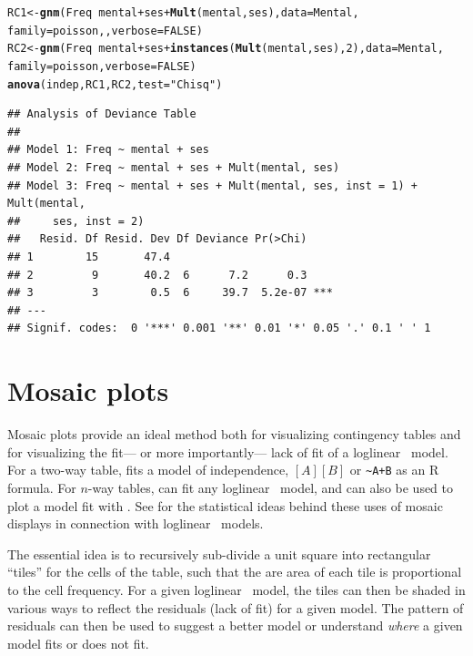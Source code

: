 \documentclass[10pt,twoside]{article}\usepackage[]{graphicx}\usepackage[]{color}
\makeatletter
\newcommand{\hlnum}[1]{\textcolor[rgb]{0.686,0.059,0.569}{#1}}%
\newcommand{\hlstr}[1]{\textcolor[rgb]{0.192,0.494,0.8}{#1}}%
\newcommand{\hlopt}[1]{\textcolor[rgb]{0,0,0}{#1}}%
\newcommand{\hlstd}[1]{\textcolor[rgb]{0.345,0.345,0.345}{#1}}%
\newcommand{\hlkwb}[1]{\textcolor[rgb]{0.69,0.353,0.396}{#1}}%
\newcommand{\hlkwc}[1]{\textcolor[rgb]{0.333,0.667,0.333}{#1}}%
\newcommand{\hlkwd}[1]{\textcolor[rgb]{0.737,0.353,0.396}{\textbf{#1}}}%
\newenvironment{kframe}{%
 \def\at@end@of@kframe{}%
 \ifinner\ifhmode%
  \def\at@end@of@kframe{\end{minipage}}%
  \begin{minipage}{\columnwidth}%
 \fi\fi%
 \def\FrameCommand##1{\hskip\@totalleftmargin \hskip-\fboxsep
 \colorbox{shadecolor}{##1}\hskip-\fboxsep
     \hskip-\linewidth \hskip-\@totalleftmargin \hskip\columnwidth}%
 \MakeFramed {\advance\hsize-\width
   \@totalleftmargin\z@ \linewidth\hsize
   \@setminipage}}%
 {\par\unskip\endMakeFramed%
 \at@end@of@kframe}
\newenvironment{knitrout}{}{} %
\newcommand{\loglin}{loglinear }
\newcommand{\codefun}[1]{\code{#1()}}
\let\proglang=\textsf
\makeatother
\begin{document}
\begin{knitrout}
\color{fgcolor}\begin{kframe}
\begin{alltt}
\hlstd{RC1} \hlkwb{<-} \hlkwd{gnm}\hlstd{(Freq} \hlopt{~} \hlstd{mental} \hlopt{+} \hlstd{ses} \hlopt{+} \hlkwd{Mult}\hlstd{(mental,ses),} \hlkwc{data}\hlstd{=Mental,}
             \hlkwc{family}\hlstd{=poisson, ,} \hlkwc{verbose}\hlstd{=}\hlnum{FALSE}\hlstd{)}
\hlstd{RC2} \hlkwb{<-} \hlkwd{gnm}\hlstd{(Freq} \hlopt{~} \hlstd{mental}\hlopt{+}\hlstd{ses} \hlopt{+} \hlkwd{instances}\hlstd{(}\hlkwd{Mult}\hlstd{(mental,ses),}\hlnum{2}\hlstd{),} \hlkwc{data}\hlstd{=Mental,}
             \hlkwc{family}\hlstd{=poisson,} \hlkwc{verbose}\hlstd{=}\hlnum{FALSE}\hlstd{)}
\hlkwd{anova}\hlstd{(indep, RC1, RC2,} \hlkwc{test}\hlstd{=}\hlstr{"Chisq"}\hlstd{)}
\end{alltt}
\begin{verbatim}
## Analysis of Deviance Table
## 
## Model 1: Freq ~ mental + ses
## Model 2: Freq ~ mental + ses + Mult(mental, ses)
## Model 3: Freq ~ mental + ses + Mult(mental, ses, inst = 1) + Mult(mental, 
##     ses, inst = 2)
##   Resid. Df Resid. Dev Df Deviance Pr(>Chi)    
## 1        15       47.4                         
## 2         9       40.2  6      7.2      0.3    
## 3         3        0.5  6     39.7  5.2e-07 ***
## ---
## Signif. codes:  0 '***' 0.001 '**' 0.01 '*' 0.05 '.' 0.1 ' ' 1
\end{verbatim}
\end{kframe}
\end{knitrout}


\section{Mosaic plots}\label{sec:mosaic}

Mosaic plots provide an ideal method both for visualizing contingency tables and for 
visualizing the fit--- or more importantly--- lack of fit of a \loglin\ model.
For a two-way table, \codefun{mosaic} fits a model of independence, $[A][B]$
or \verb|~A+B| as an \proglang{R} formula.
For $n$-way tables, \codefun{mosaic} can fit any \loglin\ model, and can also be
used to plot a model fit with \codefun{loglm}.
See \citet{vcd:Friendly:1994,vcd:Friendly:1999} for the statistical ideas behind these
uses of mosaic displays in connection with \loglin\ models.

The essential idea is to recursively sub-divide a unit square into rectangular ``tiles'' for the
cells of the table, such
that the are area of each tile is proportional to the cell frequency.
For a given \loglin\ model, the tiles can then be shaded in various ways to reflect
the residuals (lack of fit) for a given model.  The pattern of residuals can then
be used to suggest a better model or understand \emph{where} a given model fits or
does not fit.
\end{document}
